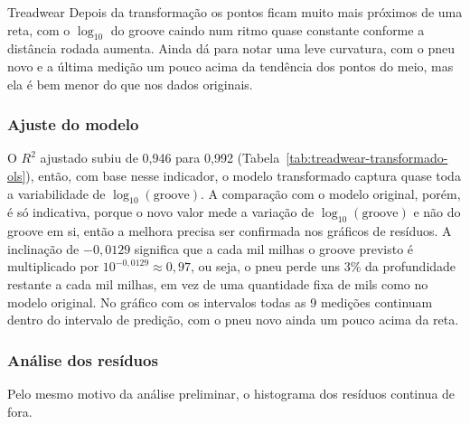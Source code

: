 \begin{dataset}{Treadwear}
Depois da transformação os pontos ficam muito mais próximos de uma reta, com o $\log_{10}$ do groove caindo num ritmo quase constante conforme a distância rodada aumenta. Ainda dá para notar uma leve curvatura, com o pneu novo e a última medição um pouco acima da tendência dos pontos do meio, mas ela é bem menor do que nos dados originais.

\subsubsection{Ajuste do modelo}


O $R^2$ ajustado subiu de 0,946 para 0,992 (Tabela~\ref{tab:treadwear-transformado-ols}), então, com base nesse indicador, o modelo transformado captura quase toda a variabilidade de $\log_{10}(\text{groove})$. A comparação com o modelo original, porém, é só indicativa, porque o novo valor mede a variação de $\log_{10}(\text{groove})$ e não do groove em si, então a melhora precisa ser confirmada nos gráficos de resíduos. A inclinação de $-0{,}0129$ significa que a cada mil milhas o groove previsto é multiplicado por $10^{-0{,}0129} \approx 0{,}97$, ou seja, o pneu perde uns 3\% da profundidade restante a cada mil milhas, em vez de uma quantidade fixa de mils como no modelo original. No gráfico com os intervalos todas as 9 medições continuam dentro do intervalo de predição, com o pneu novo ainda um pouco acima da reta.


\subsubsection{Análise dos resíduos}

Pelo mesmo motivo da análise preliminar, o histograma dos resíduos continua de fora.




\end{dataset}
